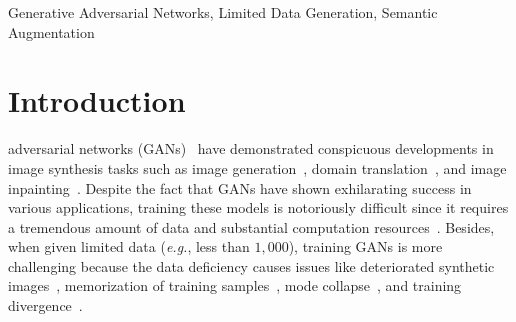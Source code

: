 \documentclass[10pt,journal,compsoc]{IEEEtran}
\begin{document}






\begin{IEEEkeywords}
Generative Adversarial Networks, Limited Data Generation, Semantic Augmentation
\end{IEEEkeywords}



\section{Introduction}
\label{sec:intro}

 adversarial networks (GANs)~\cite{goodfellow2014generative, brock2018large, karras2018progressive} have demonstrated conspicuous developments in image synthesis tasks such as image generation~\cite{brock2018large, karras2020analyzing, Karras2021, stylegan3, yang2022wavegan},
domain translation~\cite{zhu2017unpaired, park2019semantic, choi2020stargan}, and image inpainting~\cite{PEPSITNNLS, yu2018generative, Guo2021ICCV}.
Despite the fact that GANs have shown exhilarating success in various applications, training these models is notoriously difficult since it requires a tremendous amount of data and substantial computation resources~\cite{karras2020training}.
Besides, when given limited data (\emph{e.g.}, less than $1,000$), training GANs is more challenging because the data deficiency causes issues like deteriorated synthetic images~\cite{liu2021towards}, memorization of training samples~\cite{karras2020training}, mode collapse~\cite{liu2019spectral}, and training divergence~\cite{DiffAug}.
\end{document}
